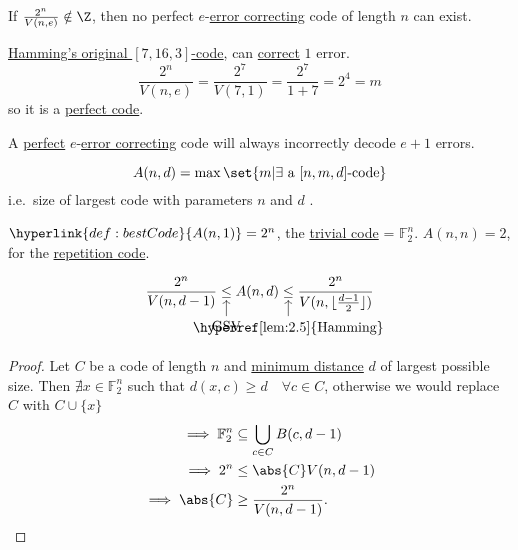 \documentclass{article}
\DeclarePairedDelimiter{\floor}{\lfloor}{\rfloor}
\newcommand{\1}[1]{\mathbbm{1}_{#1}}
\begin{document}
\begin{remark}
    If $\frac{2^n}{V(n, e)} \notin \Z$, then no perfect $e$-\hyperlink{def:errorCor}{error correcting} code of length $n$ can exist.
\end{remark}
\begin{eg}
    \hyperlink{def:hammingCode}{Hamming's original $[7,16,3]$-code}, can \hyperlink{def:errorCor}{correct} $1$ error.
    \begin{equation*}
        \frac{2^n}{V(n, e)} = \frac{2^7}{V(7, 1)} = \frac{2^7}{1 + 7} = 2^4 = m
    \end{equation*}
    so it is a \hyperlink{def:perfect}{perfect code}.
\end{eg}
\begin{remark}
    A \hyperlink{def:perfect}{perfect} $e$-\hyperlink{def:errorCor}{error correcting} code will always incorrectly decode $e+1$ errors.
\end{remark}
\begin{defi}
    \begin{equation*}
        A(n, d) = \max\set{m | \exists \text{ a } [n, m, d]\text{-code}}
    \end{equation*}
    i.e.\ size of largest code with parameters $n$ and $d$ .
\end{defi}
\begin{eg}
    $\hyperlink{def:bestCode}{A(n, 1)} = 2^n$, the \hyperlink{def:trivialCode}{trivial code} = $\mathbb{F}_2^n$. $A(n, n) = 2$, for the \hyperlink{def:repetitionCode}{repetition code}.
\end{eg}
\begin{nprop}\label{prop:2.6}
    \begin{equation*}
        \frac{2^n}{V(n, d-1)} \underset{\mathclap{
            \begin{tikzpicture}
                \node[below] (A) at (0, 0) {GSV};
                \draw[->] (A) to (0, 0.4);
            \end{tikzpicture}
        }}{\leq} A(n, d)
        \underset{\mathclap{
            \begin{tikzpicture}
                \node[below] (A) at (0, 0) {\hyperref[lem:2.5]{Hamming}};
                \draw[->] (A) to (0, 0.4);
            \end{tikzpicture}
        }}{\leq}
        \frac{2^n}{V(n, \floor{\frac{d-1}{2}})}
    \end{equation*}
\end{nprop}
\begin{proof}
    Let $C$ be a code of length $n$ and \hyperlink{def:minimumDistanceCode}{minimum distance} $d$ of largest possible size.
    Then $\nexists x \in \mathbb{F}_2^n$ such that $d(x, c) \geq d \quad \forall c \in C$, otherwise we would replace $C$ with $C \cup \{x\}$
    \begin{align*}
        \implies \mathbb{F}_2^n &\subseteq \bigcup_{c \in C}B(c, d-1) \\
        \implies 2^n &\leq \abs{C} V(n, d-1) \\
        \implies \abs{C} &\geq \frac{2^n}{V(n, d-1)}. \qedhere
    \end{align*}
\end{proof}
\end{document}
